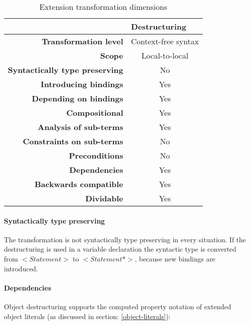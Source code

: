 \documentclass[10pt,a4paper]{article}
\begin{document}
\begin{table}[H]
\centering
\caption{Extension transformation dimensions}
\label{destructuring-table}
\begin{tabular}{@{}rc@{}}
\toprule
                                       & \multicolumn{1}{l}{\textbf{Destructuring}} \\ \midrule
\textbf{Transformation level}          & Context-free syntax                          \\
\textbf{Scope}                         & Local-to-local                               \\
\textbf{Syntactically type preserving} & No                                          \\
\textbf{Introducing bindings}          & Yes                                          \\%
\textbf{Depending on bindings}         & Yes                                           \\
\textbf{Compositional}                 & Yes                                          \\
\textbf{Analysis of sub-terms}          & Yes                                          \\
\textbf{Constraints on sub-terms}       & No                                           \\
\textbf{Preconditions}                 & No                                          \\
\textbf{Dependencies}                  & Yes                                           \\
\textbf{Backwards compatible}          & Yes                                          \\
\textbf{Dividable}                     & Yes                                           \\ \bottomrule
\end{tabular}
\end{table}

\paragraph{Syntactically type preserving}
The transformation is not syntactically type preserving in every situation. If the destructuring is used in a variable declaration the syntactic type is converted from $<Statement>$ to $<Statement*>$, because new bindings are introduced.

\paragraph{Dependencies}
Object destructuring supports the computed property notation of extended object literals (as discussed in section: \ref{object-literals}): 
\end{document}
